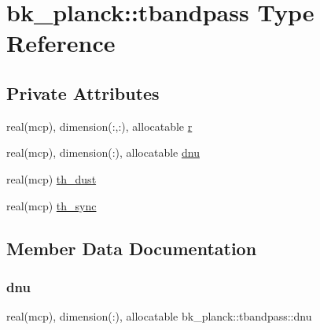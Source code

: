 \hypertarget{structbk__planck_1_1tbandpass}{}\section{bk\+\_\+planck\+:\+:tbandpass Type Reference}
\label{structbk__planck_1_1tbandpass}
\subsection*{Private Attributes}
\begin{DoxyCompactItemize}
\item 
real(mcp), dimension(\+:,\+:), allocatable \mbox{\hyperlink{structbk__planck_1_1tbandpass_adf1722e09aa72b59b097eff0db2bf530}{r}}
\item 
real(mcp), dimension(\+:), allocatable \mbox{\hyperlink{structbk__planck_1_1tbandpass_a0e57285e6edd11c7bd997a10aea4ac7a}{dnu}}
\item 
real(mcp) \mbox{\hyperlink{structbk__planck_1_1tbandpass_a7cc24a267d7fe8a1d4856787a8550672}{th\+\_\+dust}}
\item 
real(mcp) \mbox{\hyperlink{structbk__planck_1_1tbandpass_a5a346e056ff41d917a1dba59fde3a2a5}{th\+\_\+sync}}
\end{DoxyCompactItemize}


\subsection{Member Data Documentation}
\mbox{\label{structbk__planck_1_1tbandpass_a0e57285e6edd11c7bd997a10aea4ac7a}} 
\subsubsection{\texorpdfstring{dnu}{dnu}}
{\footnotesize\ttfamily real(mcp), dimension(\+:), allocatable bk\+\_\+planck\+::tbandpass\+::dnu\hspace{0.3cm}{\ttfamily [private]}}

\mbox{\label{structbk__planck_1_1tbandpass_adf1722e09aa72b59b097eff0db2bf530}} 
